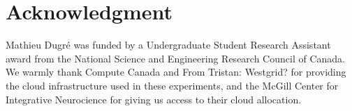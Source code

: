 \documentclass[conference]{IEEEtran}
\newcommand{\TG}[1]{\color{cyan}From Tristan: #1 \color{black}}
\begin{document}
% 
% 
% 
% 
% 
% 

\section*{Acknowledgment}

Mathieu Dugr\'e was funded by a Undergraduate Student Research Assistant award from
the National Science and Engineering Research Council of Canada. We warmly thank
Compute Canada and \TG{Westgrid?} for providing the cloud infrastructure used in
these experiments, and the McGill Center for Integrative Neurocience for giving us
access to their cloud allocation.



\end{document}
